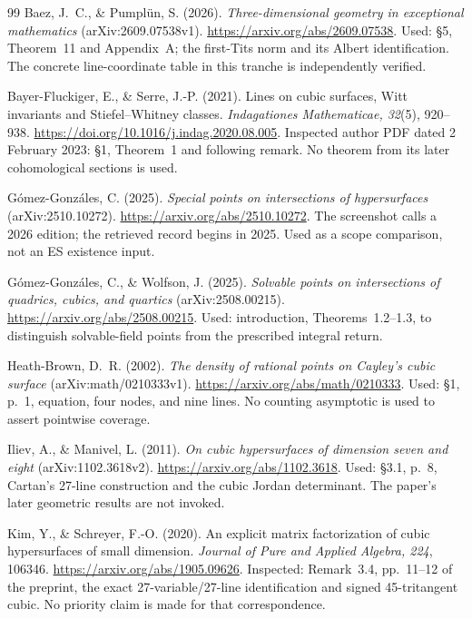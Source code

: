 \documentclass[11pt]{article}
\theoremstyle{remark}\newtheorem{remark}[theorem]{Remark}
\begin{document}
\begin{thebibliography}{99}
Baez, J.~C., \& Pumpl\"un, S. (2026).
\emph{Three-dimensional geometry in exceptional mathematics} (arXiv:2609.07538v1).
\url{https://arxiv.org/abs/2609.07538}.
Used: \S5, Theorem~11 and Appendix~A; the first-Tits norm and its Albert identification. The concrete line-coordinate table in this tranche is independently verified.

Bayer-Fluckiger, E., \& Serre, J.-P. (2021).
Lines on cubic surfaces, Witt invariants and Stiefel--Whitney classes.
\emph{Indagationes Mathematicae, 32}(5), 920--938.
\url{https://doi.org/10.1016/j.indag.2020.08.005}.
Inspected author PDF dated 2 February 2023: \S1, Theorem~1 and following remark. No theorem from its later cohomological sections is used.

G\'omez-Gonz\'ales, C. (2025).
\emph{Special points on intersections of hypersurfaces} (arXiv:2510.10272).
\url{https://arxiv.org/abs/2510.10272}.
The screenshot calls a 2026 edition; the retrieved record begins in 2025. Used as a scope comparison, not an ES existence input.

G\'omez-Gonz\'ales, C., \& Wolfson, J. (2025).
\emph{Solvable points on intersections of quadrics, cubics, and quartics}
(arXiv:2508.00215). \url{https://arxiv.org/abs/2508.00215}.
Used: introduction, Theorems~1.2--1.3, to distinguish solvable-field points from the prescribed integral return.

Heath-Brown, D.~R. (2002).
\emph{The density of rational points on Cayley's cubic surface}
(arXiv:math/0210333v1). \url{https://arxiv.org/abs/math/0210333}.
Used: \S1, p.~1, equation, four nodes, and nine lines. No counting asymptotic is used to assert pointwise coverage.

Iliev, A., \& Manivel, L. (2011).
\emph{On cubic hypersurfaces of dimension seven and eight} (arXiv:1102.3618v2).
\url{https://arxiv.org/abs/1102.3618}. Used: \S3.1, p.~8, Cartan's 27-line construction and the cubic Jordan determinant. The paper's later geometric results are not invoked.

Kim, Y., \& Schreyer, F.-O. (2020).
An explicit matrix factorization of cubic hypersurfaces of small dimension.
\emph{Journal of Pure and Applied Algebra, 224}, 106346.
\url{https://arxiv.org/abs/1905.09626}. Inspected: Remark~3.4, pp.~11--12 of the preprint, the exact 27-variable/27-line identification and signed 45-tritangent cubic. No priority claim is made for that correspondence.


\end{thebibliography}
\end{document}
